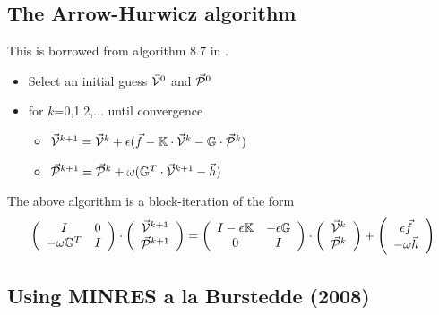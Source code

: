 \subsection{The Arrow-Hurwicz algorithm}

This is borrowed from algorithm 8.7 in \textcite{saad}.

\begin{itemize}
\item[] Select an initial guess $\vec{\cal V}^0$ and $\vec{\cal P}^0$ 
\item[] for $k$=0,1,2,... until convergence
\begin{itemize}
\item $\vec{\cal V}^{k+1}=\vec{\cal V}^k + \epsilon ( \vec{f}- {\mathbb{K}} \cdot \vec{\cal V}^k - {\mathbb{G}} \cdot \vec{\cal P}^k )$
\item $\vec{\cal P}^{k+1}=\vec{\cal P}^k + \omega ( {\mathbb{G}}^T \cdot \vec{\cal V}^{k+1} - \vec{h})$
\end{itemize}
\end{itemize}

The above algorithm is a block-iteration of the form
\[
\left(
\begin{array}{cc}
I & 0 \\
-\omega {\mathbb{G}}^T & I
\end{array}
\right)
\cdot
\left(
\begin{array}{c}
\vec{\cal V}^{k+1} \\
\vec{\cal P}^{k+1}
\end{array}
\right)
=
\left(
\begin{array}{cc}
I-\epsilon {\mathbb{K}} & -\epsilon {\mathbb{G}} \\
0 & I
\end{array}
\right)
\cdot
\left(
\begin{array}{c}
\vec{\cal V}^{k} \\
\vec{\cal P}^{k}
\end{array}
\right)
+
\left(
\begin{array}{c}
\epsilon \vec{f} \\
-\omega \vec{h}
\end{array}
\right)
\]



\subsection{Using MINRES a la Burstedde \etal (2008)}

